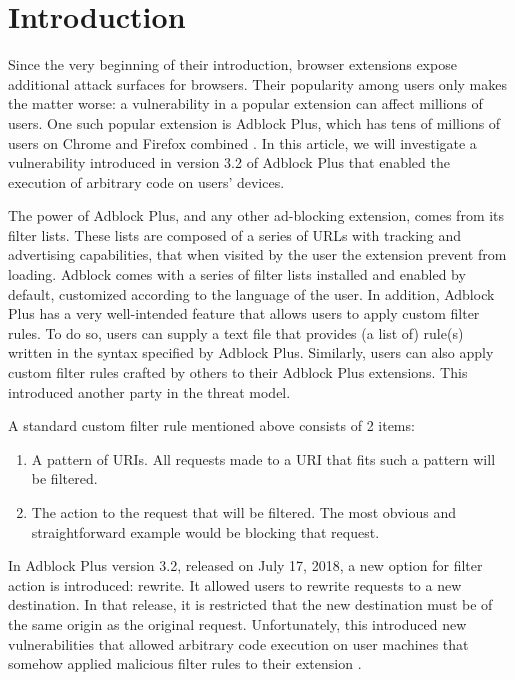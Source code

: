\documentclass[conference]{IEEEtran}
\begin{document}
\section{Introduction}
Since the very beginning of their introduction, browser extensions expose additional attack surfaces for browsers. Their popularity among users only makes the matter worse: a vulnerability in a popular extension can affect millions of users. One such popular extension is Adblock Plus, which has tens of millions of users on Chrome and Firefox combined \cite{noauthor_adblockchrome_nodate, noauthor_adblockfirefox_nodate}. In this article, we will investigate a vulnerability introduced in version 3.2 of Adblock Plus that enabled the execution of arbitrary code on users' devices.

The power of Adblock Plus, and any other ad-blocking extension, comes from its filter lists. These lists are composed of a series of URLs with tracking and advertising capabilities, that when visited by the user the extension prevent from loading. Adblock comes with a series of filter lists installed and enabled by default, customized according to the language of the user. In addition, Adblock Plus has a very well-intended feature that allows users to apply custom filter rules. To do so, users can supply a text file that provides (a list of) rule(s) written in the syntax specified by Adblock Plus. Similarly, users can also apply custom filter rules crafted by others to their Adblock Plus extensions. This introduced another party in the threat model.

A standard custom filter rule mentioned above consists of 2 items:
\begin{enumerate}
    \item A pattern of URIs. All requests made to a URI that fits such a pattern will be filtered.
    \item The action to the request that will be filtered. The most obvious and straightforward example would be blocking that request.
\end{enumerate}

In Adblock Plus version 3.2, released on July 17, 2018, a new option for filter action is introduced: rewrite. It allowed users to rewrite requests to a new destination. In that release, it is restricted that the new destination must be of the same origin as the original request. Unfortunately, this introduced new vulnerabilities that allowed arbitrary code execution on user machines that somehow applied malicious filter rules to their extension \cite{abp_code_injection,abp_issue_6622,abp_rewrite_pr,abp_filter_guide}.
\end{document}
